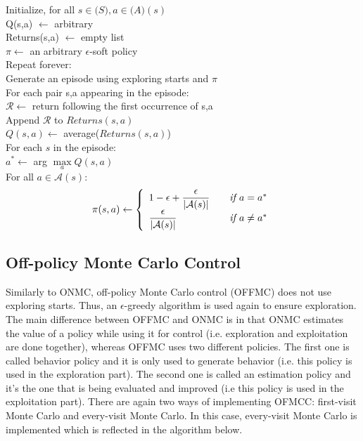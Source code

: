 \documentclass{article}
\newcommand{\tab}{\hspace{10mm}}
\newcommand{\dtab}{\hspace{20mm}}
\newcommand{\ttab}{\hspace{30mm}}
\newcommand{\qtab}{\hspace{40mm}}
\begin{document}
 
\begin{center}
\begin{mdframed}
\begin{algorithm}[H]
Initialize, for all $s \in \mathcal(S), a \in \mathcal(A)(s)$\\
\tab Q(s,a) $\leftarrow$ arbitrary \\
\tab Returns(s,a) $\leftarrow$ empty list \\
\tab $\pi \leftarrow$ an arbitrary $\epsilon$-soft policy \\
 
Repeat forever:\\
\tab Generate an episode using exploring starts and $\pi$\\
\tab For each pair s,a appearing in the episode:\\
\dtab $\mathcal{R} \leftarrow $ return following the first occurrence of s,a\\
\ttab Append $\mathcal{R}$ to $Returns(s,a)$\\
\ttab $Q(s,a) \leftarrow$ average($Returns(s,a)$)\\
\dtab For each $s$ in the episode:\\
\ttab $a^* \leftarrow$ arg $\max\limits_a Q(s,a)$\\
\ttab For all $a \in \mathcal{A}(s)$:\\

\qtab \[\pi(s,a) \leftarrow \left \{
\begin{array}{l l}
1-\epsilon + \dfrac{\epsilon}{|\mathcal{A}(s)|} & \quad \textit{if } a = a^* \\
\dfrac{\epsilon}{|\mathcal{A}(s)|} & \quad \textit{if } a \neq a^*
\end{array}\right.\]
\end{algorithm}
\end{mdframed}
\label{alg:OPMCC}
\end{center}


\subsection{Off-policy Monte Carlo Control}
Similarly to ONMC, off-policy Monte Carlo control (OFFMC) does not use exploring starts. Thus, an $\epsilon$-greedy algorithm is used again to ensure exploration. The main difference between OFFMC and ONMC is in that ONMC estimates the value of a policy while using it for control (i.e. exploration and exploitation are done together), whereas OFFMC uses two different policies. The first one is called behavior policy and it is only used to generate behavior (i.e. this policy is used in the exploration part). The second one is called an estimation policy and it's the one that is being evaluated and improved (i.e this policy is used in the exploitation part). There are again two ways of implementing OFMCC: first-visit Monte Carlo and every-visit Monte Carlo. In this case, every-visit Monte Carlo is implemented which is reflected in the algorithm below. 
\end{document}
